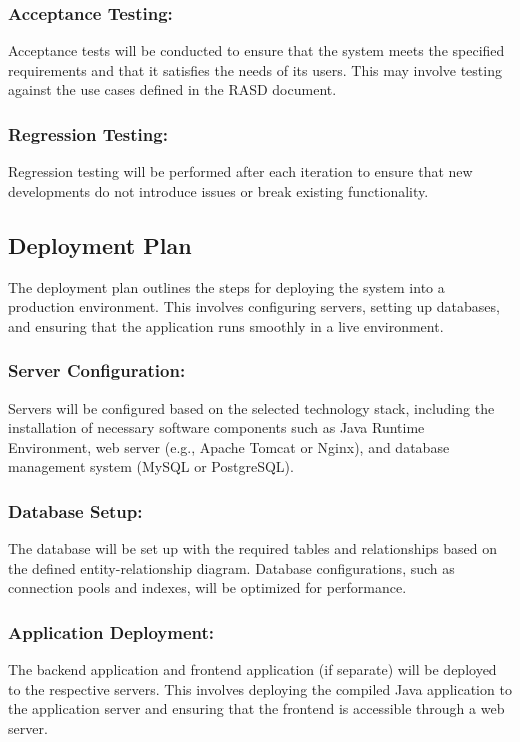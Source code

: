 \documentclass{article}
\begin{document}
\subsubsection*{Acceptance Testing:}
Acceptance tests will be conducted to ensure that the system meets the specified requirements and that it satisfies the needs of its users. This may involve testing against the use cases defined in the RASD document.

\subsubsection*{Regression Testing:}
Regression testing will be performed after each iteration to ensure that new developments do not introduce issues or break existing functionality.

\subsection{Deployment Plan}

The deployment plan outlines the steps for deploying the system into a production environment. This involves configuring servers, setting up databases, and ensuring that the application runs smoothly in a live environment.

\subsubsection*{Server Configuration:}
Servers will be configured based on the selected technology stack, including the installation of necessary software components such as Java Runtime Environment, web server (e.g., Apache Tomcat or Nginx), and database management system (MySQL or PostgreSQL).

\subsubsection*{Database Setup:}
The database will be set up with the required tables and relationships based on the defined entity-relationship diagram. Database configurations, such as connection pools and indexes, will be optimized for performance.

\subsubsection*{Application Deployment:}
The backend application and frontend application (if separate) will be deployed to the respective servers. This involves deploying the compiled Java application to the application server and ensuring that the frontend is accessible through a web server.
\end{document}
